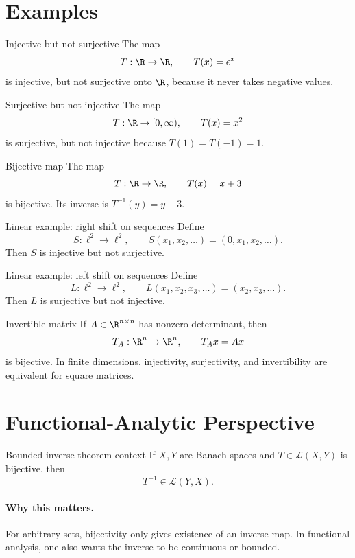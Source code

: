 \documentclass[header={Ancillary Note: Basic Mappings},notheorems]{study-note}
\begin{document}
\section{Examples}

\begin{exbox}{Injective but not surjective}
The map
\[
T:\R\to\R,
\qquad
T(x)=e^x
\]
is injective, but not surjective onto $\R$, because it never takes negative values.
\end{exbox}

\begin{exbox}{Surjective but not injective}
The map
\[
T:\R\to[0,\infty),
\qquad
T(x)=x^2
\]
is surjective, but not injective because $T(1)=T(-1)=1$.
\end{exbox}

\begin{exbox}{Bijective map}
The map
\[
T:\R\to\R,
\qquad
T(x)=x+3
\]
is bijective. Its inverse is $T^{-1}(y)=y-3$.
\end{exbox}

\begin{exbox}{Linear example: right shift on sequences}
Define
\[
S:\ell^2\to\ell^2,
\qquad
S(x_1,x_2,\dots)=(0,x_1,x_2,\dots).
\]
Then $S$ is injective but not surjective.
\end{exbox}

\begin{exbox}{Linear example: left shift on sequences}
Define
\[
L:\ell^2\to\ell^2,
\qquad
L(x_1,x_2,x_3,\dots)=(x_2,x_3,\dots).
\]
Then $L$ is surjective but not injective.
\end{exbox}

\begin{exbox}{Invertible matrix}
If $A\in\R^{n\times n}$ has nonzero determinant, then
\[
T_A:\R^n\to\R^n,
\qquad
T_Ax=Ax
\]
is bijective. In finite dimensions, injectivity, surjectivity, and invertibility are equivalent for square matrices.
\end{exbox}

\section{Functional-Analytic Perspective}

\begin{thmbox}{Bounded inverse theorem context}
If $X,Y$ are Banach spaces and $T\in\mathcal L(X,Y)$ is bijective, then
\[
T^{-1}\in\mathcal L(Y,X).
\]
\end{thmbox}

\paragraph{Why this matters.}
For arbitrary sets, bijectivity only gives existence of an inverse map. In functional analysis, one also wants the inverse to be continuous or bounded.
\end{document}
